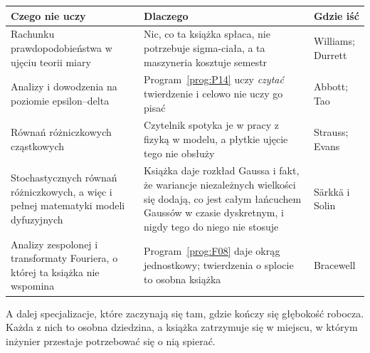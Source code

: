 \begin{center}
\begin{tabularx}{\linewidth}{@{}XXl@{}}
\toprule
\textbf{Czego nie uczy} & \textbf{Dlaczego} & \textbf{Gdzie iść} \\
\midrule
Rachunku prawdopodobieństwa w ujęciu teorii miary & Nic, co ta książka spłaca,
  nie potrzebuje sigma-ciała, a ta maszyneria kosztuje semestr & Williams;
  Durrett \\
Analizy i dowodzenia na poziomie epsilon--delta & Program~\ref{prog:P14} uczy
  \emph{czytać} twierdzenie i celowo nie uczy go pisać & Abbott; Tao \\
Równań różniczkowych cząstkowych & Czytelnik spotyka je w pracy z fizyką w
  modelu, a płytkie ujęcie tego nie obsłuży & Strauss; Evans \\
Stochastycznych równań różniczkowych, a więc i pełnej matematyki modeli
  dyfuzyjnych & Książka daje rozkład Gaussa i fakt, że wariancje niezależnych
  wielkości się dodają, co jest całym łańcuchem Gaussów w czasie dyskretnym, i
  nigdy tego do niego nie stosuje & Särkkä i Solin \\
Analizy zespolonej i transformaty Fouriera, o której ta książka nie wspomina &
  Program~\ref{prog:F08} daje okrąg jednostkowy; twierdzenia o splocie to
  osobna książka & Bracewell \\
\bottomrule
\end{tabularx}
\end{center}

\medskip
A dalej specjalizacje, które zaczynają się tam, gdzie kończy się głębokość
robocza. Każda z nich to osobna dziedzina, a książka zatrzymuje się w miejscu,
w którym inżynier przestaje potrzebować się o nią spierać.

